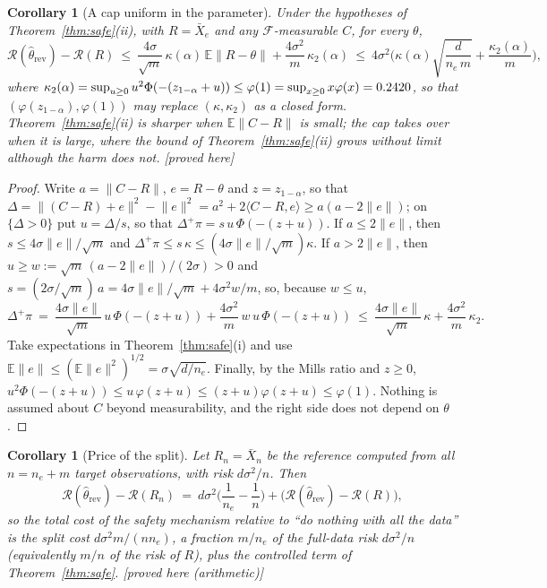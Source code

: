 \documentclass[10pt,a4paper]{article}
\theoremstyle{plain}
\newtheorem{corollary}[theorem]{Corollary}
\theoremstyle{definition}
\theoremstyle{remark}
\newcommand{\E}{\mathbb{E}}
\newcommand{\risk}{\mathcal{R}}
\newcommand{\rev}{\mathrm{rev}}
\newcommand{\norm}[1]{\lVert #1\rVert}
\newcommand{\ip}[1]{\langle #1\rangle}
\newcommand{\status}[1]{\textsf{\small [#1]}}
\begin{document}
\begin{corollary}[A cap uniform in the parameter]\label{cor:cap}
Under the hypotheses of Theorem~\ref{thm:safe}(ii), with $R=\bar X_e$ and \emph{any} $\mathcal F$-measurable $C$, for every $\theta$,
\[
\risk(\hat\theta_\rev)-\risk(R)\ \le\ \frac{4\sigma}{\sqrt m}\,\kappa(\alpha)\,\E\norm{R-\theta}+\frac{4\sigma^2}{m}\,\kappa_2(\alpha)
\ \le\ 4\sigma^2\Big(\kappa(\alpha)\sqrt{\frac{d}{n_e\,m}}+\frac{\kappa_2(\alpha)}{m}\Big),
\]
where $\kappa_2(\alpha)=\sup_{u\ge0}u^2\Phi(-(z_{1-\alpha}+u))\le\varphi(1)=\sup_{x\ge0}x\varphi(x)=0.2420$, so that $(\varphi(z_{1-\alpha}),\varphi(1))$ may replace $(\kappa,\kappa_2)$ as a closed form. Theorem~\ref{thm:safe}(ii) is sharper when $\E\norm{C-R}$ is small; the cap takes over when it is large, where the bound of Theorem~\ref{thm:safe}(ii) grows without limit although the harm does not. \status{proved here}
\end{corollary}
\begin{proof}
Write $a=\norm{C-R}$, $e=R-\theta$ and $z=z_{1-\alpha}$, so that $\Delta=\norm{(C-R)+e}^2-\norm e^2=a^2+2\ip{C-R,e}\ge a(a-2\norm e)$; on $\{\Delta>0\}$ put $u=\Delta/s$, so that $\Delta^+\pi=s\,u\,\Phi(-(z+u))$. If $a\le2\norm e$, then $s\le4\sigma\norm e/\sqrt m$ and $\Delta^+\pi\le s\,\kappa\le(4\sigma\norm e/\sqrt m)\kappa$. If $a>2\norm e$, then $u\ge w:=\sqrt m\,(a-2\norm e)/(2\sigma)>0$ and $s=(2\sigma/\sqrt m)\,a=4\sigma\norm e/\sqrt m+4\sigma^2w/m$, so, because $w\le u$,
\[
\Delta^+\pi\ =\ \frac{4\sigma\norm e}{\sqrt m}\,u\,\Phi(-(z+u))+\frac{4\sigma^2}{m}\,w\,u\,\Phi(-(z+u))\ \le\ \frac{4\sigma\norm e}{\sqrt m}\,\kappa+\frac{4\sigma^2}{m}\,\kappa_2 .
\]
Take expectations in Theorem~\ref{thm:safe}(i) and use $\E\norm e\le(\E\norm e^2)^{1/2}=\sigma\sqrt{d/n_e}$. Finally, by the Mills ratio and $z\ge0$, $u^2\Phi(-(z+u))\le u\,\varphi(z+u)\le(z+u)\varphi(z+u)\le\varphi(1)$. Nothing is assumed about $C$ beyond measurability, and the right side does not depend on $\theta$.
\end{proof}

\begin{corollary}[Price of the split]\label{cor:split}
Let $R_n=\bar X_n$ be the reference computed from all $n=n_e+m$ target observations, with risk $d\sigma^2/n$. Then
\[
\risk(\hat\theta_\rev)-\risk(R_n)\ =\ d\sigma^2\Big(\frac1{n_e}-\frac1n\Big)+\big(\risk(\hat\theta_\rev)-\risk(R)\big),
\]
so the total cost of the safety mechanism relative to ``do nothing with all the data'' is the split cost $d\sigma^2 m/(n n_e)$, a fraction $m/n_e$ of the full-data risk $d\sigma^2/n$ (equivalently $m/n$ of the risk of $R$), plus the controlled term of Theorem~\ref{thm:safe}. \status{proved here (arithmetic)}
\end{corollary}
\end{document}
